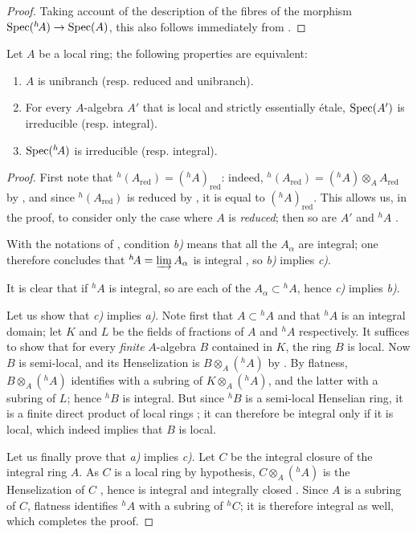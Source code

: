 \begin{proof}
Taking account of the description of the fibres of the morphism $\operatorname{Spec}({}^h\!A)\to\operatorname{Spec}(A)$, this also follows immediately from .
\end{proof}

\begin{proposition}[18.6.12]
\label{IV.18.6.12}
Let $A$ be a local ring;
the following properties are equivalent:
\begin{enumerate}[label=\emph{\alph*)}]
  \item $A$ is unibranch  \textup{(resp.} reduced and unibranch\textup{)}.
  \item For every $A$-algebra $A'$ that is local and strictly essentially \'{e}tale, $\operatorname{Spec}(A')$ is irreducible \textup{(resp.} integral\textup{)}.
  \item $\operatorname{Spec}({}^h\!A)$ is irreducible \textup{(resp.} integral\textup{)}.
\end{enumerate}
\end{proposition}

\begin{proof}
First note that ${}^h(A_{\mathrm{red}})=({}^h\!A)_{\mathrm{red}}$: indeed, ${}^h(A_{\mathrm{red}})=({}^h\!A)\otimes_{A}A_{\mathrm{red}}$ by , and since ${}^h(A_{\mathrm{red}})$ is reduced by , it is equal to $({}^h\!A)_{\mathrm{red}}$.
This allows us, in the proof, to consider only the case where $A$ is \emph{reduced}; then so are $A'$  and ${}^h\!A$ .

With the notations of , condition \emph{b)} means that all the $A_\alpha$ are integral; one therefore concludes that ${}^h\!A=\varinjlim A_\alpha$ is integral , so \emph{b)} implies \emph{c)}.

It is clear that if ${}^h\!A$ is integral, so are each of the $A_\alpha\subset{}^h\!A$, hence \emph{c)} implies \emph{b)}.

Let us show that \emph{c)} implies \emph{a)}.
Note first that $A\subset{}^h\!A$ and that ${}^h\!A$ is an integral domain;
let $K$ and $L$ be the fields of fractions of $A$ and ${}^h\!A$ respectively.
It suffices to show that for every \emph{finite} $A$-algebra $B$ contained in $K$, the ring $B$ is local.  Now $B$ is semi-local, and its Henselization is $B\otimes_{A}({}^h\!A)$ by .  By flatness, $B\otimes_{A}({}^h\!A)$ identifies with a subring of $K\otimes_{A}({}^h\!A)$, and the latter with a subring of $L$; hence ${}^h\!B$ is integral.  But since ${}^h\!B$ is a semi-local Henselian ring, it is a finite direct product of local rings ; it can therefore be integral only if it is local, which indeed implies that $B$ is local.

Let us finally prove that \emph{a)} implies \emph{c)}.
Let $C$ be the integral closure of the integral ring $A$.
As $C$ is a local ring by hypothesis, $C\otimes_{A}({}^h\!A)$ is the Henselization of $C$ , hence is integral and integrally closed .
Since $A$ is a subring of $C$, flatness identifies ${}^h\!A$ with a subring of ${}^h\!C$; it is therefore integral as well, which completes the proof.
\end{proof}

